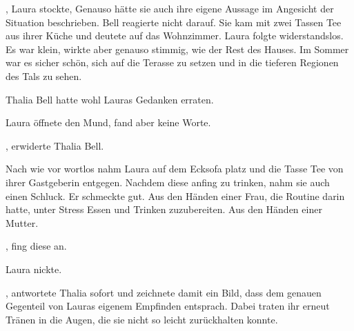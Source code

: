 \par

, Laura stockte,  Genauso hätte sie auch ihre eigene Aussage im Angesicht der Situation beschrieben. Bell reagierte nicht darauf. Sie kam mit zwei Tassen Tee aus ihrer Küche und deutete auf das Wohnzimmer. Laura folgte widerstandslos. Es war klein, wirkte aber genauso stimmig, wie der Rest des Hauses. Im Sommer war es sicher schön, sich auf die Terasse zu setzen und in die tieferen Regionen des Tals zu sehen.

\par

Thalia Bell hatte wohl Lauras Gedanken erraten. 

\par

Laura öffnete den Mund, fand aber keine Worte.

\par

, erwiderte Thalia Bell. 

\par

Nach wie vor wortlos nahm Laura auf dem Ecksofa platz und die Tasse Tee von ihrer Gastgeberin entgegen. Nachdem diese anfing zu trinken, nahm sie auch einen Schluck. Er schmeckte gut. Aus den Händen einer Frau, die Routine darin hatte, unter Stress Essen und Trinken zuzubereiten. Aus den Händen einer Mutter.

\par

, fing diese an. 

\par

Laura nickte.

\par

, antwortete Thalia sofort und zeichnete damit ein Bild, dass dem genauen Gegenteil von Lauras eigenem Empfinden entsprach.  Dabei traten ihr erneut Tränen in die Augen, die sie nicht so leicht zurückhalten konnte. 

